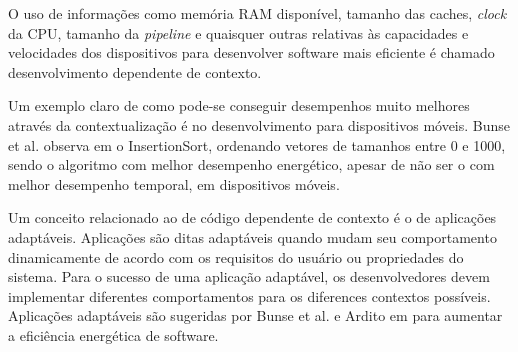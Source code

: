 O uso de informações como memória RAM disponível, tamanho das caches, \emph{clock} da CPU, tamanho da \emph{pipeline} e quaisquer outras relativas às capacidades e velocidades dos dispositivos para desenvolver software mais eficiente é chamado desenvolvimento dependente de contexto.

Um exemplo claro de como pode-se conseguir desempenhos muito melhores através da contextualização é no desenvolvimento para dispositivos móveis. Bunse et al. observa em \cite{bunse2009exploring} o InsertionSort, ordenando vetores de tamanhos entre 0 e 1000, sendo o algoritmo com melhor desempenho energético, apesar de não ser o com melhor desempenho temporal, em dispositivos móveis.

Um conceito relacionado ao de código dependente de contexto é o de aplicações adaptáveis. Aplicações são ditas adaptáveis quando mudam seu comportamento dinamicamente de acordo com os requisitos do usuário ou propriedades do sistema. Para o sucesso de uma aplicação adaptável, os desenvolvedores devem implementar diferentes comportamentos para os diferences contextos possíveis. Aplicações adaptáveis são sugeridas por Bunse et al. \cite{bunse2009choosing} e Ardito em \cite{ardito2013energy} para aumentar a eficiência energética de software.





